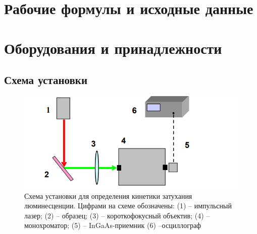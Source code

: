 
\section{Рабочие формулы и исходные данные}\label{sec:initial_data}


%

\section{Оборудования и принадлежности}\label{sec:stuff}
\subsection{Схема установки}\label{subsec:schemes}
\begin{figure}[H]
        \centering
        \includegraphics[width=0.7\columnwidth]{figures/Scheme}%
        \caption{Схема установки для определения кинетики затухания
люминесценции. Цифрами на схеме обозначены: (1) – импульсный лазер; (2)
– образец; (3) – короткофокусный объектив; (4) – монохроматор; (5) –
InGaAs-приемник (6) –осциллограф}
		\label{fig:Scheme}
\end{figure}
